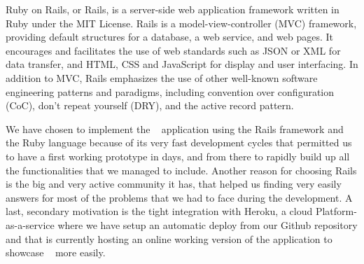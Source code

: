 Ruby on Rails, or Rails, is a server-side web application framework written in Ruby under the MIT License. Rails is a model-view-controller (MVC) framework, providing default structures for a database, a web service, and web pages. It encourages and facilitates the use of web standards such as JSON or XML for data transfer, and HTML, CSS and JavaScript for display and user interfacing. In addition to MVC, Rails emphasizes the use of other well-known software engineering patterns and paradigms, including convention over configuration (CoC), don't repeat yourself (DRY), and the active record pattern.

We have chosen to implement the \projectname~ application using the Rails framework and the Ruby language because of its very fast development cycles that permitted us to have a first working prototype in days, and from there to rapidly build up all the functionalities that we managed to include. Another reason for choosing Rails is the big and very active community it has, that helped us finding very easily answers for most of the problems that we had to face during the development. A last, secondary motivation is the tight integration with Heroku, a cloud Platform-as-a-service where we have setup an automatic deploy from our Github repository and that is currently hosting an online working version of the application to showcase \projectname~ more easily.